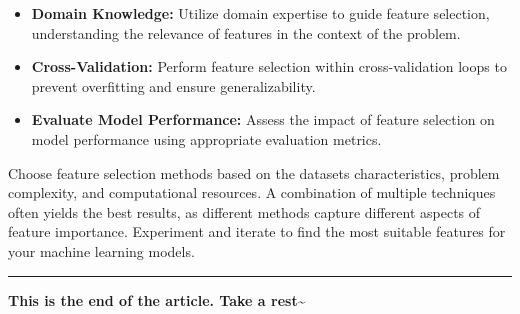 \documentclass[
]{article}
\begin{document}
\begin{itemize}
\item
  \textbf{Domain Knowledge:} Utilize domain expertise to guide feature
  selection, understanding the relevance of features in the context of
  the problem.
\item
  \textbf{Cross-Validation:} Perform feature selection within
  cross-validation loops to prevent overfitting and ensure
  generalizability.
\item
  \textbf{Evaluate Model Performance:} Assess the impact of feature
  selection on model performance using appropriate evaluation metrics.
\end{itemize}

Choose feature selection methods based on the dataset\textquotesingle s
characteristics, problem complexity, and computational resources. A
combination of multiple techniques often yields the best results, as
different methods capture different aspects of feature importance.
Experiment and iterate to find the most suitable features for your
machine learning models.

\begin{center}\rule{0.5\linewidth}{0.5pt}\end{center}

\textbf{This is the end of the article. Take a rest\textasciitilde{}}
\end{document}

